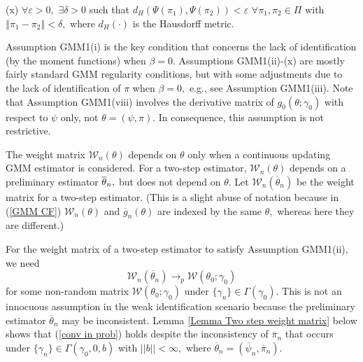 \documentclass[12pt,thmsb,titlepage,final,oneside,letterpaper]{article}
\begin{document}
\noindent (x) $\forall \varepsilon >0,$ $\exists \delta >0$ such that $%
d_{H}\left( \Psi \left( \pi _{1}\right) ,\Psi \left( \pi _{2}\right) \right)
<\varepsilon $ $\forall \pi _{1},\pi _{2}\in \Pi $ with $\left\Vert \pi
_{1}-\pi _{2}\right\Vert <\delta ,$ where $d_{H}\left( \cdot \right) $ is
the Hausdorff metric.\medskip

Assumption GMM1(i) is the key condition that concerns the lack of
identification (by the moment functions) when $\beta =0.$ Assumptions
GMM1(ii)-(x) are mostly fairly standard GMM regularity conditions, but with
some adjustments due to the lack of identification of $\pi $ when $\beta =0,$
e.g., see Assumption GMM1(iii). Note that Assumption GMM1(viii) involves the
derivative matrix of $g_{0}(\theta ;\gamma _{0})$ with respect to $\psi $
only, not $\theta =(\psi ,\pi ).$ In consequence, this assumption is not
restrictive.

The weight matrix $\mathcal{W}_{n}(\theta )$ depends on $\theta $ only when
a continuous updating GMM estimator is considered. For a two-step estimator, 
$\mathcal{W}_{n}(\theta )$ depends on a preliminary estimator $\overline{%
\theta }_{n},$ but does not depend on $\theta .$ Let $\mathcal{W}_{n}(%
\overline{\theta }_{n})$ be the weight matrix for a two-step estimator.
(This is a slight abuse of notation because in (\ref{GMM CF}) $\mathcal{W}%
_{n}(\theta )$ and $\overline{g}_{n}(\theta )$ are indexed by the same $%
\theta ,$ whereas here they are different.)

For the weight matrix of a two-step estimator to satisfy Assumption
GMM1(ii), we need 
\begin{equation}
\mathcal{W}_{n}(\overline{\theta }_{n})\rightarrow _{p}\mathcal{W}(\theta
_{0};\gamma _{0})  \label{conv in prob}
\end{equation}%
for some non-random matrix $\mathcal{W}(\theta _{0};\gamma _{0})$ under $%
\{\gamma _{n}\}\in \Gamma (\gamma _{0}).$ This is not an innocuous
assumption in the weak identification scenario because the preliminary
estimator $\overline{\theta }_{n}$ may be inconsistent. Lemma \ref{Lemma Two
step weight matrix} below shows that (\ref{conv in prob}) holds despite the
inconsistency of $\overline{\pi }_{n}$ that occurs under $\{\gamma _{n}\}\in
\Gamma (\gamma _{0},0,b)$ with $||b||<\infty ,$ where $\overline{\theta }%
_{n}=(\overline{\psi }_{n},\overline{\pi }_{n}).$
\end{document}

